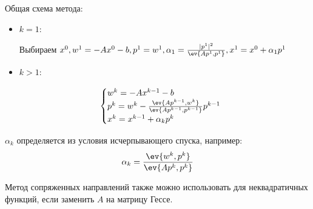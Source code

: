 Общая схема метода:
\begin{itemize}
    \item \(k = 1\):

          Выбираем \(x^0, w^1 = - Ax^0 - b, p^1 = w^1, \alpha_1 = \frac{|p^1|^2}{\ev{Ap^1, p^1}}, x^1 = x^0 + \alpha_1 p^1\)

    \item \(k > 1\):

          \begin{equation}
              \begin{cases}
                  w^k = - Ax^{k - 1} - b                                                         \\
                  p^k = w^k - \frac{\ev{Ap^{k - 1}, w^k}}{\ev{A p^{k - 1}, p^{k - 1}}} p^{k - 1} \\
                  x^k = x^{k - 1} + \alpha_k p^k
              \end{cases}
              \label{fdsa}
          \end{equation}
\end{itemize}

\(\alpha_k\) определяется из условия исчерпывающего спуска, например:
\[\alpha_k = \frac{\ev{w^k, p^k}}{\ev{Ap^k, p^k}}\]

Метод сопряженных направлений также можно использовать для неквадратичных функций, если заменить \(A\) на матрицу Гессе.


\unfinished
